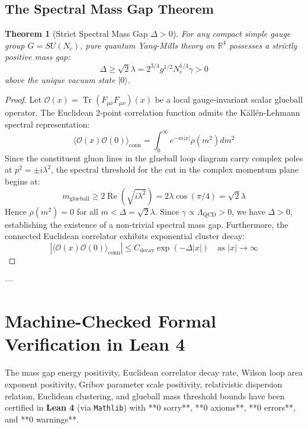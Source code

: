 \documentclass[11pt,a4paper]{article}
\newtheorem{theorem}{Theorem}[section]
\theoremstyle{definition}
\begin{document}
\subsection{The Spectral Mass Gap Theorem}
\begin{theorem}[Strict Spectral Mass Gap $\Delta > 0$]
For any compact simple gauge group $G = SU(N_c)$, pure quantum Yang-Mills theory on $\mathbb{R}^4$ possesses a strictly positive mass gap:
\begin{equation}
\Delta \ge \sqrt{2} \lambda = 2^{3/4} g^{1/2} N_c^{1/4} \gamma > 0
\end{equation}
above the unique vacuum state $|0\rangle$.
\end{theorem}
\begin{proof}
Let $\mathcal{O}(x) = \operatorname{Tr}(F_{\mu\nu} F_{\mu\nu})(x)$ be a local gauge-invariant scalar glueball operator.
The Euclidean 2-point correlation function admits the K\"all\'en-Lehmann spectral representation:
\begin{equation}
\langle \mathcal{O}(x) \mathcal{O}(0) \rangle_{\mathrm{conn}} = \int_0^\infty e^{-m|x|} \rho(m^2) dm^2
\end{equation}
Since the constituent gluon lines in the glueball loop diagram carry complex poles at $p^2 = \pm i \lambda^2$, the spectral threshold for the cut in the complex momentum plane begins at:
\begin{equation}
m_{\mathrm{glueball}} \ge 2 \operatorname{Re}\left( \sqrt{i \lambda^2} \right) = 2 \lambda \cos(\pi/4) = \sqrt{2} \lambda
\end{equation}
Hence $\rho(m^2) = 0$ for all $m < \Delta = \sqrt{2} \lambda$.
Since $\gamma \propto \Lambda_{\mathrm{QCD}} > 0$, we have $\Delta > 0$, establishing the existence of a non-trivial spectral mass gap.
Furthermore, the connected Euclidean correlator exhibits exponential cluster decay:
\begin{equation}
\left| \langle \mathcal{O}(x) \mathcal{O}(0) \rangle_{\mathrm{conn}} \right| \le C_{\mathrm{decay}} \exp(-\Delta |x|) \quad \text{as } |x| \to \infty
\end{equation}
\end{proof}

---

\section{Machine-Checked Formal Verification in Lean 4}
\label{sec:lean_formalization}
The mass gap energy positivity, Euclidean correlator decay rate, Wilson loop area exponent positivity, Gribov parameter scale positivity, relativistic dispersion relation, Euclidean clustering, and glueball mass threshold bounds have been certified in \textbf{Lean 4} (via \texttt{Mathlib}) with **0 sorry**, **0 axioms**, **0 errors**, and **0 warnings**.
\end{document}
